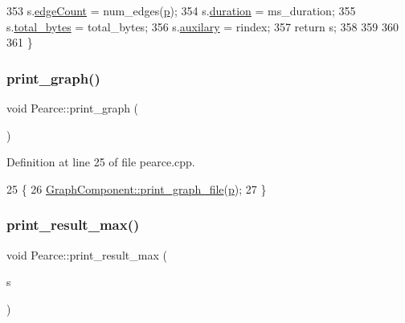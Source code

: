 \begin{DoxyCode}
353     s.\hyperlink{struct_utility_structs_1_1_storage_items_afafcba9bb103108e2c1e1d9254fb75c5}{edgeCount} = num\_edges(\hyperlink{class_pearce_a2320928312fd97f6bcb1f16684f79a03}{p});
354     s.\hyperlink{struct_utility_structs_1_1_storage_items_a65e7df5611a4e144cc27576bd3041f6c}{duration} = ms\_duration;
355     s.\hyperlink{struct_utility_structs_1_1_storage_items_a39cf482db54d8e6ac473b438444c8a1e}{total\_bytes} = total\_bytes;
356     s.\hyperlink{struct_utility_structs_1_1_storage_items_afb9d346eaacb1c5e7f60f559c45910f2}{auxilary} = rindex;
357     \textcolor{keywordflow}{return} s;
358       
359     
360 
361 \}
\end{DoxyCode}
\mbox{\label{class_pearce_a96ed7e50d992838177699b6133464554}} 
\subsubsection{\texorpdfstring{print\+\_\+graph()}{print\_graph()}}
{\footnotesize\ttfamily void Pearce\+::print\+\_\+graph (\begin{DoxyParamCaption}{ }\end{DoxyParamCaption})}



Definition at line 25 of file pearce.\+cpp.


\begin{DoxyCode}
25                         \{
26     \hyperlink{class_graph_component_a6af293dac3774fde0e2822b5725ecacd}{GraphComponent::print\_graph\_file}(\hyperlink{class_pearce_a2320928312fd97f6bcb1f16684f79a03}{p});
27 \}
\end{DoxyCode}
\mbox{\label{class_pearce_aaa906779c670a16948c00a9c031e6986}} 
\subsubsection{\texorpdfstring{print\+\_\+result\+\_\+max()}{print\_result\_max()}}
{\footnotesize\ttfamily void Pearce\+::print\+\_\+result\+\_\+max (\begin{DoxyParamCaption}\item[{\hyperlink{struct_utility_structs_1_1_storage_items}{Utility\+Structs\+::\+Storage\+Items} \&}]{s }\end{DoxyParamCaption})}



